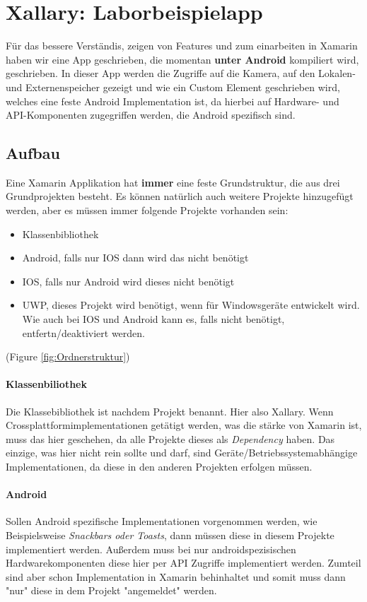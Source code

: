 \section{Xallary: Laborbeispielapp}
Für das bessere Verständis, zeigen von Features und zum einarbeiten in Xamarin haben wir eine App geschrieben, die 
momentan \textbf{unter Android} kompiliert wird, geschrieben.
In dieser App werden die Zugriffe auf die Kamera, auf den Lokalen- und Externenspeicher
gezeigt und wie ein Custom Element geschrieben wird, welches eine feste Android
Implementation ist, da hierbei auf Hardware- und API-Komponenten zugegriffen werden,
die Android spezifisch sind.
\subsection{Aufbau}
Eine Xamarin Applikation hat \textbf{immer} eine feste Grundstruktur, die aus drei Grundprojekten besteht.
Es können natürlich auch weitere Projekte hinzugefügt werden, aber es müssen immer folgende Projekte
vorhanden sein:
\begin{itemize}
    \item Klassenbibliothek
    \item Android, falls nur IOS dann wird das nicht benötigt
    \item IOS, falls nur Android wird dieses nicht benötigt
    \item UWP, dieses Projekt wird benötigt, wenn für Windowsgeräte entwickelt wird. Wie auch bei IOS und Android kann es, falls nicht benötigt, entfertn/deaktiviert werden.
\end{itemize}
(Figure \ref{fig:Ordnerstruktur}) 
\paragraph{Klassenbiliothek} Die Klassebibliothek ist nachdem Projekt benannt. 
Hier also Xallary. Wenn Crossplattformimplementationen 
getätigt werden, was die stärke von Xamarin ist, 
muss das hier geschehen,
da alle Projekte dieses als \textit{Dependency} haben. 
Das einzige, was hier nicht rein sollte und darf, sind Geräte/Betriebssystemabhängige Implementationen, da diese in den anderen Projekten erfolgen müssen.
\paragraph{Android} Sollen Android spezifische Implementationen vorgenommen werden, wie Beispielsweise \textit{Snackbars oder Toasts}, dann 
müssen diese in diesem Projekte implementiert werden. Außerdem muss bei nur androidspezisischen Hardwarekomponenten
diese hier per API Zugriffe implementiert werden. Zumteil sind aber schon Implementation in Xamarin behinhaltet und somit muss dann "nur"
diese in dem Projekt "angemeldet" werden.

